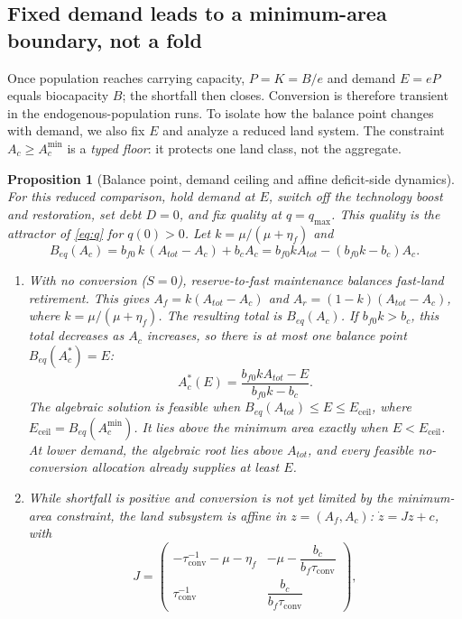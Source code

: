 \documentclass[preprint,12pt,authoryear]{elsarticle}
\newtheorem{proposition}{Proposition}
\newcommand{\Eceil}{E_{\mathrm{ceil}}}
\newcommand{\Acmin}{A_c^{\min}}
\newcommand{\tconv}{\tau_{\mathrm{conv}}}
\begin{document}
\subsection{Fixed demand leads to a minimum-area boundary, not a fold}\label{sec:ceiling}

Once population reaches carrying capacity, $P=K=B/e$ and demand $E=eP$ equals biocapacity $B$; the shortfall then closes. Conversion is therefore transient in the endogenous-population runs. To isolate how the balance point changes with demand, we also fix $E$ and analyze a reduced land system. The constraint $A_c\ge\Acmin$ is a \emph{typed floor}: it protects one land class, not the aggregate.

\begin{proposition}[Balance point, demand ceiling and affine deficit-side dynamics]\label{prop:ceiling}
For this reduced comparison, hold demand at $E$, switch off the technology boost and restoration, set debt $D=0$, and fix quality at $q=q_{\max}$. This quality is the attractor of \eqref{eq:q} for $q(0)>0$. Let $k=\mu/(\mu+\eta_f)$ and
\begin{equation}\label{eq:Beq}
B_{eq}(A_c)=b_{f0}\,k\,(A_{tot}-A_c)+b_cA_c=b_{f0}kA_{tot}-(b_{f0}k-b_c)A_c .
\end{equation}
\begin{enumerate}[label=(\roman*)]
\item With no conversion ($S=0$), reserve-to-fast maintenance balances fast-land retirement. This gives $A_f=k(A_{tot}-A_c)$ and $A_r=(1-k)(A_{tot}-A_c)$, where $k=\mu/(\mu+\eta_f)$. The resulting total is $B_{eq}(A_c)$. If $b_{f0}k>b_c$, this total decreases as $A_c$ increases, so there is at most one balance point $B_{eq}(A_c^*)=E$:
\begin{equation}\label{eq:Acstar}
A_c^*(E)=\frac{b_{f0}kA_{tot}-E}{b_{f0}k-b_c}.
\end{equation}
The algebraic solution is feasible when $B_{eq}(A_{tot})\le E\le\Eceil$, where $\Eceil=B_{eq}(\Acmin)$. It lies above the minimum area exactly when $E<\Eceil$. At lower demand, the algebraic root lies above $A_{tot}$, and every feasible no-conversion allocation already supplies at least $E$.
\item While shortfall is positive and conversion is not yet limited by the minimum-area constraint, the land subsystem is affine in $z=(A_f,A_c)$: $\dot z=Jz+c$, with
\begin{equation}\label{eq:J}
J=\begin{pmatrix}-\tconv^{-1}-\mu-\eta_f & -\mu-\dfrac{b_c}{b_f\tconv}\\[8pt] \tconv^{-1} & \dfrac{b_c}{b_f\tconv}\end{pmatrix},

\end{equation}
\end{enumerate}
\end{proposition}
\end{document}
